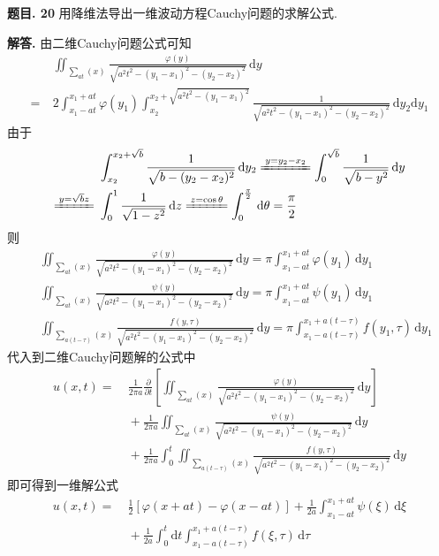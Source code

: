 \documentclass[12pt, a4paper, oneside]{ctexart}
\newcounter{problem}  %
\newenvironment{problem}[1][]{\stepcounter{problem}\par\noindent\textbf{题目\arabic{problem}. #1}}{\smallskip\par}
\newenvironment{solution}[1][]{\par\noindent\textbf{#1解答. }}{\smallskip\par}  %
\def\d{\mathrm{d}}          %
\begin{document}
\begin{problem}[20]
    用降维法导出一维波动方程Cauchy问题的求解公式.
\end{problem}
\begin{solution}
    由二维Cauchy问题公式可知
    \begin{align*}
        &\ \iint_{\sum_{at}(x)}\frac{\varphi(y)}{\sqrt{a^2t^2-(y_1-x_1)^2-(y_2-x_2)^2}}\,\d y\\
        =&\ 2\int_{x_1-at}^{x_1+at}\varphi(y_1)\int_{x_2}^{x_2+\sqrt{a^2t^2-(y_1-x_1)^2}}\frac{1}{\sqrt{a^2t^2-(y_1-x_1)^2-(y_2-x_2)^2}}\,\d y_2\d y_1
    \end{align*}
    由于\begin{align*}
        &\ \int_{x_2}^{x_2+\sqrt{b}}\frac{1}{\sqrt{b-(y_2-x_2)^2}}\,\d y_2\xlongequal{y=y_2-x_2}\int_0^{\sqrt{b}}\frac{1}{\sqrt{b-y^2}}\,\d y\\
        \xlongequal{y=\sqrt{b}z}&\ \int_0^1\frac{1}{\sqrt{1-z^2}}\,\d z\xlongequal{z=\cos \theta}\int_0^{\frac{\pi}{2}}\,\d \theta = \frac{\pi}{2}
    \end{align*}
    则
    \begin{align*}
        &\ \iint_{\sum_{at}(x)}\frac{\varphi(y)}{\sqrt{a^2t^2-(y_1-x_1)^2-(y_2-x_2)^2}}\,\d y = \pi\int_{x_1-at}^{x_1+at}\varphi(y_1)\,\d y_1\\
        &\ \iint_{\sum_{at}(x)}\frac{\psi(y)}{\sqrt{a^2t^2-(y_1-x_1)^2-(y_2-x_2)^2}}\,\d y = \pi\int_{x_1-at}^{x_1+at}\psi(y_1)\,\d y_1\\
        &\ \iint_{\sum_{a(t-\tau)}(x)}\frac{f(y,\tau)}{\sqrt{a^2t^2-(y_1-x_1)^2-(y_2-x_2)^2}}\,\d y = \pi\int_{x_1-a(t-\tau)}^{x_1+a(t-\tau)}f(y_1,\tau)\,\d y_1
    \end{align*}
    代入到二维Cauchy问题解的公式中
    \begin{align*}
        u(x,t) =&\ \frac{1}{2\pi a}\frac{\partial}{\partial t}\left[\iint_{\sum_{at}(x)}\frac{\varphi(y)}{\sqrt{a^2t^2-(y_1-x_1)^2-(y_2-x_2)^2}}\,\d y\right]\\
        &\ +\frac{1}{2\pi a}\iint_{\sum_{at}(x)}\frac{\psi(y)}{\sqrt{a^2t^2-(y_1-x_1)^2-(y_2-x_2)^2}}\,\d y\\
        &\ +\frac{1}{2\pi a}\int_0^t\iint_{\sum_{a(t-\tau)}(x)}\frac{f(y,\tau)}{\sqrt{a^2t^2-(y_1-x_1)^2-(y_2-x_2)^2}}\,\d y
    \end{align*}
    即可得到一维解公式
    \begin{align*}
        u(x,t) =&\ \frac{1}{2}[\varphi(x+at)-\varphi(x-at)]+\frac{1}{2a}\int_{x_1-at}^{x_1+at}\psi(\xi)\,\d \xi\\
        &\ +\frac{1}{2a}\int_0^t\d t\int_{x_1-a(t-\tau)}^{x_1+a(t-\tau)}f(\xi,\tau)\,\d\tau
    \end{align*}
\end{solution}
\end{document}
